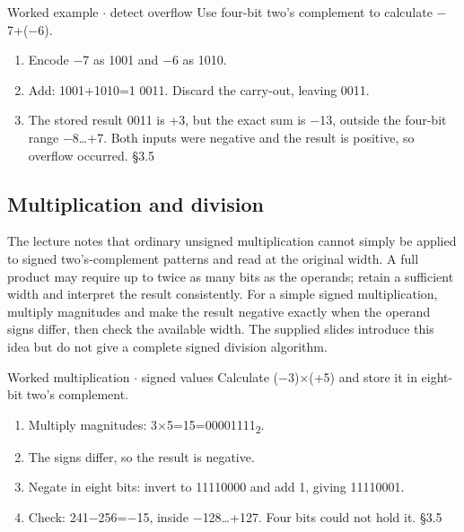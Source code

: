 \documentclass[11pt]{article}
\begin{document}
\begin{keepsection}
\begin{keepsection}
\begin{workedbox}{Worked example \ensuremath{\cdot} detect overflow}
Use four-bit two’s complement to calculate \ensuremath{-}7+(\ensuremath{-}6).

\begin{enumerate}
\item Encode \ensuremath{-}7 as 1001 and \ensuremath{-}6 as 1010.
\item Add: 1001+1010=1 0011. Discard the carry-out, leaving 0011.
\item The stored result 0011 is +3, but the exact sum is \ensuremath{-}13, outside the four-bit range \ensuremath{-}8…+7. Both inputs were negative and the result is positive, so overflow occurred. \hfill{\small\color{FAUblue}§3.5}
\end{enumerate}
\end{workedbox}
\end{keepsection}

\begin{keepsection}
\subsection{Multiplication and division}

The lecture notes that ordinary unsigned multiplication cannot simply be applied to signed two’s-complement patterns and read at the original width. A full product may require up to twice as many bits as the operands; retain a sufficient width and interpret the result consistently. For a simple signed multiplication, multiply magnitudes and make the result negative exactly when the operand signs differ, then check the available width. The supplied slides introduce this idea but do not give a complete signed division algorithm.

\begin{workedbox}{Worked multiplication \ensuremath{\cdot} signed values}
Calculate (\ensuremath{-}3)\ensuremath{\times}(+5) and store it in eight-bit two’s complement.

\begin{enumerate}
\item Multiply magnitudes: 3\ensuremath{\times}5=15=00001111\textsubscript{2}.
\item The signs differ, so the result is negative.
\item Negate in eight bits: invert to 11110000 and add 1, giving 11110001.
\item Check: 241\ensuremath{-}256=\ensuremath{-}15, inside \ensuremath{-}128…+127. Four bits could not hold it. \hfill{\small\color{FAUblue}§3.5}
\end{enumerate}
\end{workedbox}


\end{keepsection}
\end{keepsection}
\end{document}
